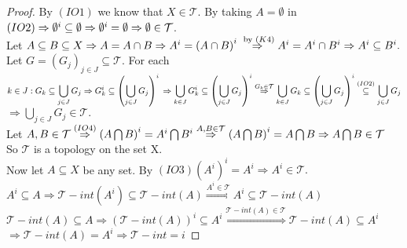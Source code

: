 \documentclass[a4paper,12pt]{report}
\begin{document}
\begin{proof}
By $(IO1)$ we know that $X\in\mathcal{T}$. By taking $A = \emptyset$ in $(IO2) \\ \Rightarrow \emptyset^i \subseteq \emptyset \Rightarrow \emptyset^i = \emptyset \Rightarrow \emptyset \in \mathcal{T}$.\\

Let $A\subseteq B \subseteq X \Rightarrow A = A \cap B \Rightarrow A^i = \left(A\cap B\right)^i \overset{\text{ by } (K4)}{\Rightarrow} A^i = A^i \cap B^i \\ \Rightarrow A^i \subseteq B^i.$\\

Let $G = \left(G_j\right)_{j\in J} \subseteq \mathcal{T}.$ For each $k \in J: G_k \subseteq \displaystyle\bigcup_{j\in J} G_j \Rightarrow G_k^i \subseteq \left(\bigcup_{j \in J} G_j \right)^i \\ \Rightarrow \displaystyle\bigcup_{k \in J} G_k^i \subseteq \left(\bigcup_{j\in J}G_j\right)^i \overset{G_k \in \mathcal{T}}{\Rightarrow} \displaystyle\bigcup_{k \in J} G_k \subseteq \left(\bigcup_{j\in J}G_j\right)^i \overset{(IO2)}{\subseteq} \bigcup_{j\in J}G_j$\\
$\Rightarrow \displaystyle\bigcup_{j\in J}G_j \in \mathcal{T}.$\\

Let $A,B\in\mathcal{T} \overset{(IO4)}{\Rightarrow} \left(A\bigcap B\right)^i =  A^i \bigcap B^i \overset{A,B \in \mathcal{T}}{\Rightarrow} \left(A \bigcap B\right)^i = A\bigcap B \\ \Rightarrow A\bigcap B \in \mathcal{T}$\\

So $\mathcal{T}$ is a topology on the set X.\\

Now let $A\subseteq X$ be any set. By $(IO3) \left(A^i\right)^i = A^i \Rightarrow A^i \in\mathcal{T}.$\\
$A^i \subseteq A \Rightarrow \mathcal{T}-int(A^i) \subseteq \mathcal{T}-int(A) \overset{A^i \in\mathcal{T}}{\Rightarrow} A^i \subseteq \mathcal{T}-int(A)$\\
$\mathcal{T}-int(A)\subseteq A \Rightarrow \left(\mathcal{T}-int(A)\right)^i \subseteq A^i \overset{\mathcal{T}-int(A) \in\mathcal{T}}{\Longrightarrow} \mathcal{T}-int(A) \subseteq A^i$\\

$\Rightarrow \mathcal{T}-int(A) = A^i \Rightarrow \mathcal{T}-int = i$


\end{proof}
\end{document}
